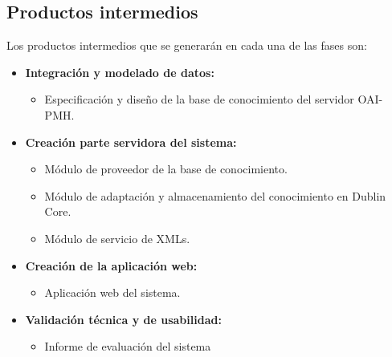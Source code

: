 \subsection{Productos intermedios}

Los productos intermedios que se generarán en cada una de las fases son:

\begin{itemize}
	\item \textbf{Integración y modelado de datos:}
	\begin{itemize}
		\item Especificación y diseño de la base de conocimiento del servidor OAI-PMH.
	\end{itemize}
	\item \textbf{Creación parte servidora del sistema:}
	\begin{itemize}
		\item Módulo de proveedor de la base de conocimiento.
		\item Módulo de adaptación y almacenamiento del conocimiento en Dublin Core.
		\item Módulo de servicio de XMLs.
	\end{itemize}
	\item \textbf{Creación de la aplicación web:}
	\begin{itemize}
		\item Aplicación web del sistema.
	\end{itemize}
	\item \textbf{Validación técnica y de usabilidad:}
	\begin{itemize}
		\item Informe de evaluación del sistema
	\end{itemize}
\end{itemize}